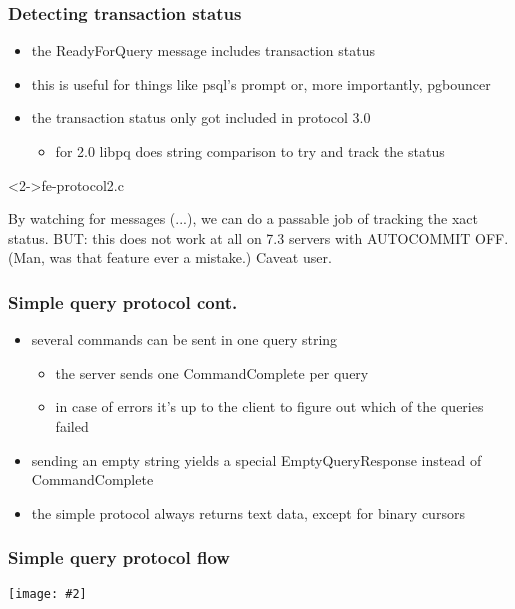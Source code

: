 \documentclass{beamer}
\newcommand{\mscdiagram}[2][1]{
  \begin{center}
    \texttt{[image: \#2]}
  \end{center}
}
\begin{document}
\begin{frame}[fragile]
  \frametitle{Detecting transaction status}

  \begin{itemize}
  \item the ReadyForQuery message includes transaction status
  \item this is useful for things like psql's prompt or, more importantly,
    pgbouncer
  \item the transaction status only got included in protocol 3.0
    \begin{itemize}
    \item for 2.0 libpq does string comparison to try and track the status
    \end{itemize}
  \end{itemize}

  \begin{block}<2->{fe-protocol2.c}
    \begin{semiverbatim}
    By watching for messages (...), we can do a passable
    job of tracking the xact status.  BUT: this does not
    work at all on 7.3 servers with AUTOCOMMIT OFF.
    (Man, was that feature ever a mistake.)  Caveat user.
    \end{semiverbatim}
  \end{block}
\end{frame}

\begin{frame}
  \frametitle{Simple query protocol cont.}

  \begin{itemize}
  \item several commands can be sent in one query string
    \begin{itemize}
    \item the server sends one CommandComplete per query
    \item in case of errors it's up to the client to figure out which of the
      queries failed
    \end{itemize}
  \item sending an empty string yields a special EmptyQueryResponse instead of
    CommandComplete
  \item the simple protocol always returns text data, except for binary cursors
  \end{itemize}
\end{frame}

\begin{frame}
  \frametitle{Simple query protocol flow}

  \mscdiagram{simple-query-protocol}
\end{frame}
\end{document}
